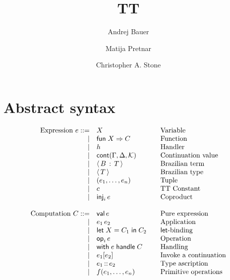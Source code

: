 \documentclass{article}
\newcommand{\G}{\Gamma}
\newcommand{\D}{\Delta}
\newcommand{\bnf}{\mathrel{{:}{:}{=}}}
\newcommand{\bnfor}{|}
\newcommand{\C}{C}     %
\newcommand{\X}{X}     %
\newcommand{\e}{e}     %
\newcommand{\rgn}{r}   %
\newcommand{\T}{T}     %
\newcommand{\B}{B}     %
\newcommand{\KK}{{\cal K}} %
\newcommand{\val}{\mathsf{val}\,} %
\newcommand{\letin}[1]{\mathsf{let}\; #1 \;\mathsf{in}\;} %
\newcommand{\opOp}[2][i]{\mathsf{op}_{#1}\,#2} %
\newcommand{\withhandle}[1]{\mathsf{with}\;#1\;\mathsf{handle}\;} %
\newcommand{\abs}[1]{\mathsf{abs}\;#1\;\mathsf{in}\;} %
\newcommand{\new}[2]{\mathsf{new}(#1,#2)} %
\newcommand{\fun}[1]{\mathsf{fun}\;#1\Rightarrow} %
\newcommand{\app}[2]{#1\,#2} %
\newcommand{\kapp}[2]{#1{}[#2]} %
\newcommand{\bterm}[2]{\langle\,#1\, :\, #2\,\rangle} %
\newcommand{\bty}[1]{\langle\,#1\,\rangle} %
\newcommand{\cont}[2][\G,\D]{\mathsf{cont}(#1,#2)}     %
\newcommand{\tuple}[1]{(#1)}
\newcommand{\generictuple}[1][n]{\tuple{e_1,\ldots,\e_{#1}}}
\renewcommand{\c}{c} %
\newcommand{\prim}[2][f]{#1(#2)} %
\newcommand{\genericprim}{\prim{\e_1,\ldots,\e_n}}
\newcommand{\inj}[2][i]{\mathsf{inj}_{#1}\, #2}
\newcommand{\ascribe}[2]{#1 \,{:}{:}\, #2} %
\begin{document}
\title{TT}
\author{Andrej Bauer \and Matija Pretnar \and Christopher A. Stone}
\maketitle

\section{Abstract syntax}
\label{sec:abstract-syntax}

\begin{equation*}
  \begin{array}{rl@{\qquad}l}
  \text{Expression $\e$}
    \bnf    & \X          & \text{Variable} \\
    \bnfor  & \fun{\X} \C  & \text{Function} \\
    \bnfor  & h           & \text{Handler} \\
    \bnfor  & \cont{\KK} & \text{Continuation value} \\
    \bnfor  & \bterm{\B}{\T}           & \text{Brazilian term} \\
    \bnfor  & \bty{\T}           & \text{Brazilian type} \\
    \bnfor  & \generictuple   & \text{Tuple}\\
    \bnfor  & \c              & \text{TT Constant}\\
    \bnfor  & \inj{\e}        & \text{Coproduct}\\
    \\
    \text{Computation $\C$}
      \bnf  & \val \e                & \text{Pure expression} \\
    \bnfor  & \app{\e_1}{\e_2}   & \text{Application} \\
    \bnfor  & \letin{\X = \C_1} \C_2  & \text{$\mathsf{let}$-binding} \\
    \bnfor  & \opOp{\e} & \text{Operation} \\
    \bnfor  & \withhandle{\e} \C & \text{Handling} \\
    \bnfor  & \kapp{\e_1}{\e_2}   & \text{Invoke a continuation} \\
    \bnfor  & \ascribe{\e_1}{\e_2} & \text{Type ascription} \\
    \bnfor  & \genericprim & \text{Primitive operations}\\

\end{array}
\end{equation*}
\end{document}

